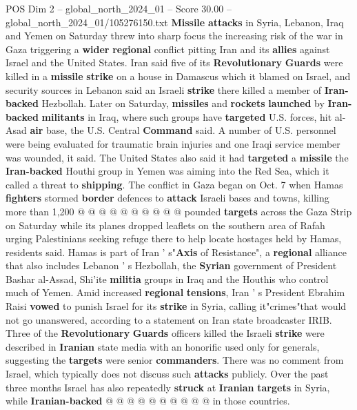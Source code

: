 \begin{textsample}{POS Dim 2 – global\_north\_2024\_01 – Score 30.00 – global\_north\_2024\_01/105276150.txt}  \label{ex:f2_pos_103}
\textbf{Missile} \textbf{attacks} in Syria, Lebanon, Iraq and Yemen on Saturday threw into sharp focus the increasing risk of the war in Gaza triggering a \textbf{wider} \textbf{regional} conflict pitting Iran and its \textbf{allies} against Israel and the United States.
Iran said five of its \textbf{Revolutionary} \textbf{Guards} were killed in a \textbf{missile} \textbf{strike} on a house in Damascus which it blamed on Israel, and security sources in Lebanon said an Israeli \textbf{strike} there killed a member of \textbf{Iran-backed} Hezbollah.
Later on Saturday, \textbf{missiles} and \textbf{rockets} \textbf{launched} by \textbf{Iran-backed} \textbf{militants} in Iraq, where such groups have \textbf{targeted} U.S. forces, hit al-Asad \textbf{air} base, the U.S.
Central \textbf{Command} said.
A number of U.S. personnel were being evaluated for traumatic brain injuries and one Iraqi service member was wounded, it said.
The United States also said it had \textbf{targeted} a \textbf{missile} the \textbf{Iran-backed} Houthi group in Yemen was aiming into the Red Sea, which it called a threat to \textbf{shipping}.
The conflict in Gaza began on Oct. 7 when Hamas \textbf{fighters} stormed \textbf{border} defences to \textbf{attack} Israeli bases and towns, killing more than 1,200 @ @ @ @ @ @ @ @ @ @ pounded \textbf{targets} across the Gaza Strip on Saturday while its planes dropped leaflets on the southern area of Rafah urging Palestinians seeking refuge there to help locate hostages held by Hamas, residents said.
Hamas is part of Iran ' s"\textbf{Axis} of Resistance", a \textbf{regional} alliance that also includes Lebanon ' s Hezbollah, the \textbf{Syrian} government of President Bashar al-Assad, Shi'ite \textbf{militia} groups in Iraq and the Houthis who control much of Yemen.
Amid increased \textbf{regional} \textbf{tensions}, Iran ' s President Ebrahim Raisi \textbf{vowed} to punish Israel for its \textbf{strike} in Syria, calling it"crimes"that would not go unanswered, according to a statement on Iran state broadcaster IRIB.
Three of the \textbf{Revolutionary} \textbf{Guards} officers killed the Israeli \textbf{strike} were described in \textbf{Iranian} state media with an honorific used only for generals, suggesting the \textbf{targets} were senior \textbf{commanders}.
There was no comment from Israel, which typically does not discuss such \textbf{attacks} publicly.
Over the past three months Israel has also repeatedly \textbf{struck} at \textbf{Iranian} \textbf{targets} in Syria, while \textbf{Iranian-backed} @ @ @ @ @ @ @ @ @ @ in those countries.

\end{textsample}
